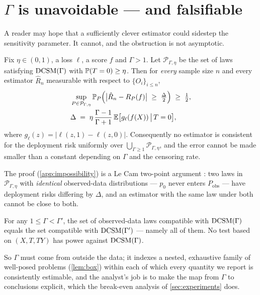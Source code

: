 \section{$\Gamma$ is unavoidable --- and falsifiable}
\label{sec:impossibility}

A reader may hope that a sufficiently clever estimator could sidestep the
sensitivity parameter. It cannot, and the obstruction is not asymptotic.

\begin{theorem}[Impossibility]
\label{thm:impossible}
Fix $\eta\in(0,1)$, a loss $\ell$, a score $f$ and $\Gamma>1$. Let
$\mathcal{P}_{\Gamma,\eta}$ be the set of laws satisfying $\textup{DCSM}(\Gamma)$ with
$\mathbb{P}(T=0)\ge\eta$. Then for \emph{every} sample size $n$ and every estimator
$\hat R_n$ measurable with respect to $\{O_i\}_{i\le n}$,
\begin{equation}
\begin{aligned}
  &\sup_{P\in\mathcal{P}_{\Gamma,\eta}}
  \mathbb{P}_P\!\left(\big|\hat R_n - R_P(f)\big| \;\ge\; \tfrac{\Delta}{2}\right)
  \;\ge\; \tfrac12,\\
  &\Delta \;=\; \eta\,\frac{\Gamma-1}{\Gamma+1}\,
  \mathbb{E}\big[g_\ell(f(X))\,\big|\,T=0\big],
\end{aligned}
  \label{eq:impossible}
\end{equation}
where $g_\ell(z)=|\ell(z,1)-\ell(z,0)|$. Consequently no estimator is
consistent for the deployment risk uniformly over
$\bigcup_{\Gamma\ge1}\mathcal{P}_{\Gamma,\eta}$, and the error cannot be made
smaller than a constant depending on $\Gamma$ and the censoring rate.
\end{theorem}

The proof (\cref{app:impossibility}) is a Le Cam two-point argument
\citep{lecam1973convergence}: two laws in $\mathcal{P}_{\Gamma,\eta}$ with
\emph{identical} observed-data distributions --- $p_0$ never enters
$P_{\mathrm{obs}}$ --- have deployment risks differing by $\Delta$, and an
estimator with the same law under both cannot be close to both.

\begin{corollary}
\label{cor:gamma-unidentified}
For any $1\le\Gamma<\Gamma'$, the set of observed-data laws compatible with
$\textup{DCSM}(\Gamma)$ equals the set compatible with $\textup{DCSM}(\Gamma')$ --- namely all of
them. No test based on $(X,T,TY)$ has power against $\textup{DCSM}(\Gamma)$.
\end{corollary}

So $\Gamma$ must come from outside the data; it indexes a nested, exhaustive
family of well-posed problems (\cref{lem:box}) within each of which every
quantity we report is consistently estimable, and the analyst's job is to make
the map from $\Gamma$ to conclusions explicit, which the break-even analysis of
\cref{sec:experiments} does.


